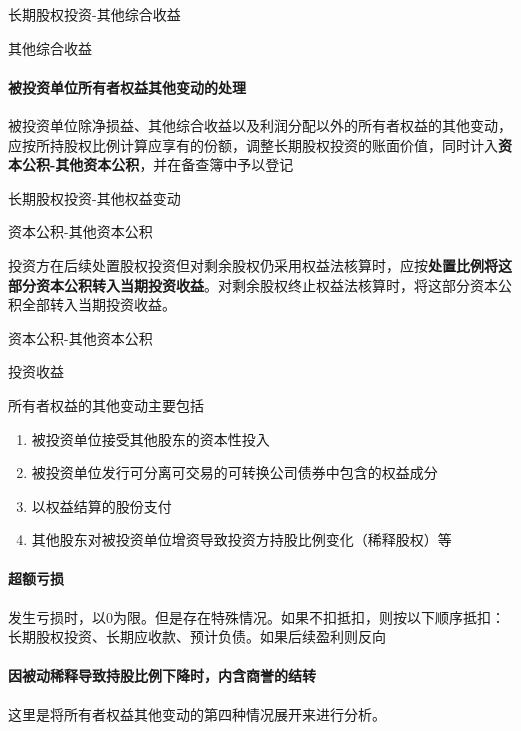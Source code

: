 \documentclass[UTF8,12pt]{ctexart}
\newenvironment{Dr}{%
	\begin{list}{}%
		{
			\setlength{\leftmargin}{2em}
			\setlength{\labelwidth}{2em}
			\setlength{\labelsep}{0pt}
			\setlength{\itemindent}{0pt}
			\setlength{\listparindent}{0pt}
			\setlength{\parsep}{0pt}
			\setlength{\topsep}{0pt}
		}
		\item[\textbf{借：}]
	}{%
	\end{list}
}
\newenvironment{Cr}{%
	\begin{list}{}%
		{
			\setlength{\leftmargin}{3em}
			\setlength{\labelwidth}{2em}
			\setlength{\labelsep}{0pt}
			\setlength{\itemindent}{0pt}
			\setlength{\listparindent}{0pt}
			\setlength{\parsep}{0pt}
			\setlength{\topsep}{0pt}
		}
		\item[\textbf{贷：}]
	}{%
	\end{list}
}
\numberwithin{equation}{section} %
\numberwithin{figure}{section}
\numberwithin{table}{section}
\begin{document}
	\begin{Dr}
		长期股权投资-其他综合收益
	\end{Dr}
	\begin{Cr}
		其他综合收益
	\end{Cr}
	
	\paragraph{被投资单位所有者权益其他变动的处理}
	被投资单位除净损益、其他综合收益以及利润分配以外的所有者权益的其他变动，应按所持股权比例计算应享有的份额，调整长期股权投资的账面价值，同时计入\textbf{资本公积-其他资本公积}，并在备查簿中予以登记
	
	\begin{Dr}
		长期股权投资-其他权益变动
	\end{Dr}
	\begin{Cr}
		资本公积-其他资本公积
	\end{Cr}
	
	投资方在后续处置股权投资但对剩余股权仍采用权益法核算时，应按\textbf{处置比例将这部分资本公积转入当期投资收益}。对剩余股权终止权益法核算时，将这部分资本公积全部转入当期投资收益。
	
	\begin{Dr}
		资本公积-其他资本公积
	\end{Dr}
	\begin{Cr}
		投资收益
	\end{Cr}
	
	所有者权益的其他变动主要包括
	\begin{enumerate}
		\item 被投资单位接受其他股东的资本性投入
		
		\item 被投资单位发行可分离可交易的可转换公司债券中包含的权益成分
		
		\item 以权益结算的股份支付
		
		\item 其他股东对被投资单位增资导致投资方持股比例变化（稀释股权）等
	\end{enumerate}
	
	\paragraph{超额亏损}
	发生亏损时，以0为限。但是存在特殊情况。如果不扣抵扣，则按以下顺序抵扣：长期股权投资、长期应收款、预计负债。如果后续盈利则反向
	
	\paragraph{因被动稀释导致持股比例下降时，内含商誉的结转} 这里是将所有者权益其他变动的第四种情况展开来进行分析。
	
\end{document}
